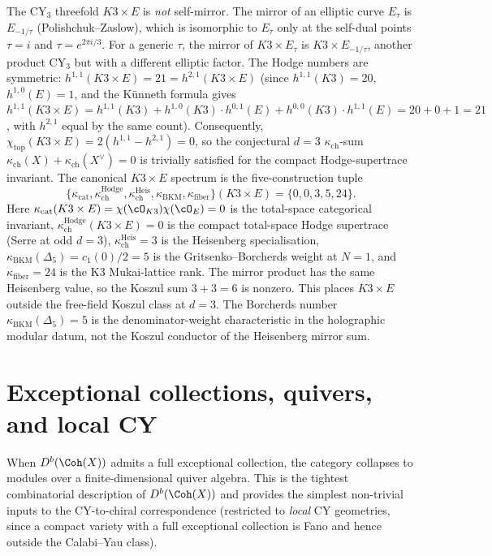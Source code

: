 \begin{remark}[K3 \texorpdfstring{$\times$}{x} E and the d=3 mirror problem]
\label{rem:k3e-mirror-problem}
The CY$_3$ threefold $K3 \times E$ is \emph{not} self-mirror. The mirror of an elliptic curve $E_\tau$ is $E_{-1/\tau}$ (Polishchuk--Zaslow), which is isomorphic to $E_\tau$ only at the self-dual points $\tau = i$ and $\tau = e^{2\pi i/3}$. For a generic $\tau$, the mirror of $K3 \times E_\tau$ is $K3 \times E_{-1/\tau}$, another product CY$_3$ but with a different elliptic factor. The Hodge numbers are symmetric: $h^{1,1}(K3 \times E) = 21 = h^{2,1}(K3 \times E)$ (since $h^{1,1}(K3) = 20$, $h^{1,0}(E) = 1$, and the K\"unneth formula gives $h^{1,1}(K3 \times E) = h^{1,1}(K3) + h^{1,0}(K3) \cdot h^{0,1}(E) + h^{0,0}(K3) \cdot h^{1,1}(E) = 20 + 0 + 1 = 21$, with $h^{2,1}$ equal by the same count). Consequently, $\chi_{\mathrm{top}}(K3 \times E) = 2(h^{1,1} - h^{2,1}) = 0$, so the conjectural $d = 3$ $\kappa_{\mathrm{ch}}$-sum $\kappa_{\mathrm{ch}}(X) + \kappa_{\mathrm{ch}}(X^\vee) = 0$ is trivially satisfied for the compact Hodge-supertrace invariant. The canonical $K3 \times E$ spectrum is the five-construction tuple
\[
 \{\kappa_{\mathrm{cat}}, \kappa_{\mathrm{ch}}^{\mathrm{Hodge}},
 \kappa_{\mathrm{ch}}^{\mathrm{Heis}},
 \kappa_{\mathrm{BKM}}, \kappa_{\mathrm{fiber}}\}(K3 \times E)
 = \{0, 0, 3, 5, 24\}.
\]
Here $\kappa_{\mathrm{cat}}(K3 \times E)=\chi(\cO_{K3})\chi(\cO_E)=0$
is the total-space categorical invariant,
$\kappa_{\mathrm{ch}}^{\mathrm{Hodge}}(K3 \times E) = 0$ is the
compact total-space Hodge supertrace (Serre at odd $d=3$),
$\kappa_{\mathrm{ch}}^{\mathrm{Heis}}=3$ is the Heisenberg
specialisation, $\kappa_{\mathrm{BKM}}(\Delta_5) = c_1(0)/2=5$ is the
Gritsenko--Borcherds weight at $N=1$, and $\kappa_{\mathrm{fiber}}=24$
is the K3 Mukai-lattice rank. The mirror product has the same Heisenberg value, so the Koszul sum $3+3=6$ is nonzero. This places $K3 \times E$ outside the free-field Koszul class at $d = 3$. The Borcherds number $\kappa_{\mathrm{BKM}}(\Delta_5)=5$ is the denominator-weight characteristic in the holographic modular datum, not the Koszul conductor of the Heisenberg mirror sum.
\end{remark}


\section{Exceptional collections, quivers, and local CY}
\label{sec:exceptional-quivers}

When $D^b(\Coh(X))$ admits a full exceptional collection, the category collapses to modules over a finite-dimensional quiver algebra. This is the tightest combinatorial description of $D^b(\Coh(X))$ and provides the simplest non-trivial inputs to the CY-to-chiral correspondence (restricted to \emph{local} CY geometries, since a compact variety with a full exceptional collection is Fano and hence outside the Calabi--Yau class).

